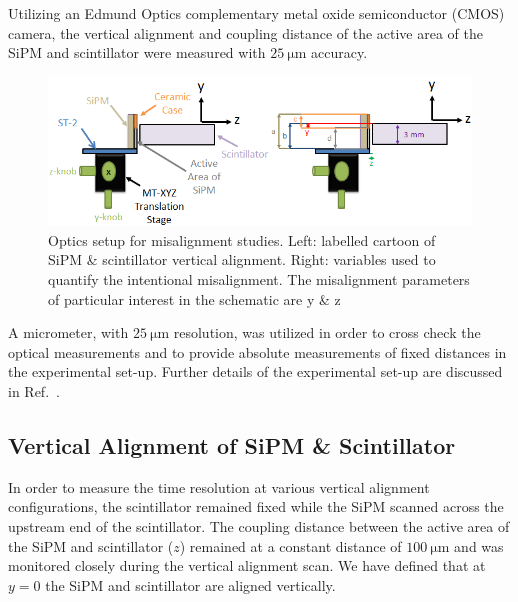 Utilizing an Edmund Optics complementary metal oxide semiconductor (CMOS) camera, the vertical alignment and coupling distance of the active area of the SiPM and scintillator were measured with $25~\mathrm{\mu m}$ accuracy.
	\begin{figure}[!htb]
		\centering
		\includegraphics[width=1.0\columnwidth]{misalignment/figs/sipm_va_optics_schematic}
		\caption{Optics setup for misalignment studies.  Left: labelled cartoon of SiPM \&
		scintillator vertical alignment. Right: variables used to quantify the intentional misalignment.  The misalignment parameters of particular interest in the schematic are y \& z}
		\label{fig:sipm_va_optics}
	\end{figure}
A micrometer, with $25~\mathrm{\mu m}$ resolution, was utilized in order to cross check the optical measurements and to provide absolute measurements of fixed distances in the experimental set-up. Further details of the experimental set-up are discussed in Ref.~\cite{pooser16}.

\subsection{Vertical Alignment of SiPM \& Scintillator}
\label{sec:misalign_vert}


In order to measure the time resolution at various vertical alignment configurations, the scintillator remained fixed while the SiPM scanned across the upstream end of the scintillator. The coupling distance between the active area of the SiPM and scintillator ($z$) remained at a constant distance of $\mathrm{100\ \mu m}$ and was monitored closely during the vertical alignment scan.  We have defined that at $y = 0$ the SiPM and scintillator are aligned vertically.  %

